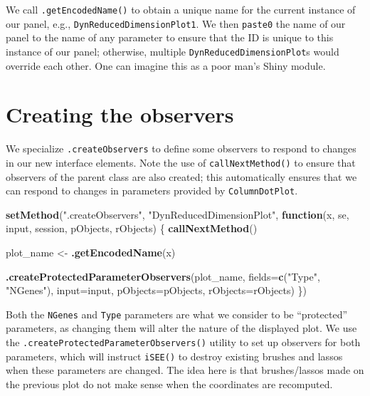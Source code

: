 \documentclass[]{book}
\newenvironment{Shaded}{\begin{snugshade}}{\end{snugshade}}
\newcommand{\KeywordTok}[1]{\textcolor[rgb]{0.13,0.29,0.53}{\textbf{#1}}}
\newcommand{\DataTypeTok}[1]{\textcolor[rgb]{0.13,0.29,0.53}{#1}}
\newcommand{\StringTok}[1]{\textcolor[rgb]{0.31,0.60,0.02}{#1}}
\newcommand{\ControlFlowTok}[1]{\textcolor[rgb]{0.13,0.29,0.53}{\textbf{#1}}}
\newcommand{\NormalTok}[1]{#1}
\begin{document}
We call \texttt{.getEncodedName()} to obtain a unique name for the
current instance of our panel, e.g., \texttt{DynReducedDimensionPlot1}.
We then \texttt{paste0} the name of our panel to the name of any
parameter to ensure that the ID is unique to this instance of our panel;
otherwise, multiple \texttt{DynReducedDimensionPlot}s would override
each other. One can imagine this as a poor man's Shiny module.

\section{Creating the observers}\label{creating-the-observers}

We specialize \texttt{.createObservers} to define some observers to
respond to changes in our new interface elements. Note the use of
\texttt{callNextMethod()} to ensure that observers of the parent class
are also created; this automatically ensures that we can respond to
changes in parameters provided by \texttt{ColumnDotPlot}.

\begin{Shaded}
\begin{Highlighting}[]
\KeywordTok{setMethod}\NormalTok{(}\StringTok{".createObservers"}\NormalTok{, }\StringTok{"DynReducedDimensionPlot"}\NormalTok{, }
    \ControlFlowTok{function}\NormalTok{(x, se, input, session, pObjects, rObjects) }
\NormalTok{\{}
    \KeywordTok{callNextMethod}\NormalTok{()}

\NormalTok{    plot_name <-}\StringTok{ }\KeywordTok{.getEncodedName}\NormalTok{(x)}

    \KeywordTok{.createProtectedParameterObservers}\NormalTok{(plot_name,}
        \DataTypeTok{fields=}\KeywordTok{c}\NormalTok{(}\StringTok{"Type"}\NormalTok{, }\StringTok{"NGenes"}\NormalTok{),}
        \DataTypeTok{input=}\NormalTok{input, }\DataTypeTok{pObjects=}\NormalTok{pObjects, }\DataTypeTok{rObjects=}\NormalTok{rObjects)}
\NormalTok{\})}
\end{Highlighting}
\end{Shaded}

Both the \texttt{NGenes} and \texttt{Type} parameters are what we
consider to be ``protected'' parameters, as changing them will alter the
nature of the displayed plot. We use the
\texttt{.createProtectedParameterObservers()} utility to set up
observers for both parameters, which will instruct \texttt{iSEE()} to
destroy existing brushes and lassos when these parameters are changed.
The idea here is that brushes/lassos made on the previous plot do not
make sense when the coordinates are recomputed.
\end{document}
